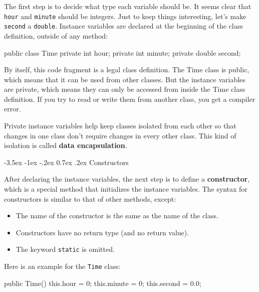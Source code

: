\documentclass[12pt]{book}
\makeatletter
\theoremstyle{exercise}
\newcommand{\java}[1]{\verb"#1"}
\renewcommand{\section}{\@startsection{section}{1}{\z@}%
    {-3.5ex \@plus -1ex \@minus -.2ex}%
    {0.7ex \@plus.2ex}%
    {\normalfont\Large\bfseries}}
\newcommand{\java}[1]{\lstinline{#1}} %
\makeatother
\begin{document}
The first step is to decide what type each variable should be.
It seems clear that \java{hour} and \java{minute} should be integers.
Just to keep things interesting, let's make \java{second} a \java{double}.
Instance variables are declared at the beginning of the class definition, outside of any method:

\begin{code}
public class Time {
    private int hour;
    private int minute;
    private double second;
}
\end{code}

By itself, this code fragment is a legal class definition.
The Time class is public, which means that it can be used from other classes.
But the instance variables are private, which means they can only be accessed from inside the Time class definition.
If you try to read or write them from another class, you get a compiler error.


Private instance variables help keep classes isolated from each other so that changes in one class don't require changes in every other class.
This kind of isolation is called {\bf data encapsulation}.



\section{Constructors}


After declaring the instance variables, the next step is to define a {\bf constructor}, which is a special method that initializes the instance variables.
The syntax for constructors is similar to that of other methods, except:

\begin{itemize}
\item The name of the constructor is the same as the name of the class.
\item Constructors have no return type (and no return value).
\item The keyword \java{static} is omitted.
\end{itemize}

Here is an example for the \java{Time} class:

\begin{code}
    public Time() {
        this.hour = 0;
        this.minute = 0;
        this.second = 0.0;
    }
\end{code}
\end{document}
